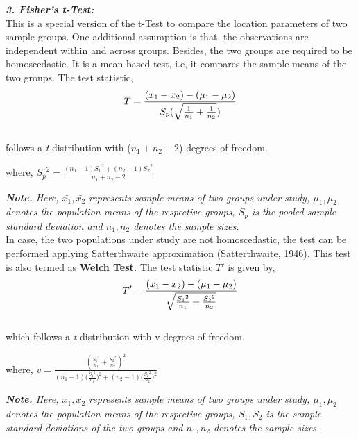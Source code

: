 \documentclass[12pt,a4paper]{report}
\begin{document}
\Large{{\textbf{\textit{3. Fisher's t-Test: }}} }\\
\Large{This is a special version of the t-Test to compare the location parameters of two sample groups. One additional assumption is that, the observations are independent within and across groups. Besides, the two groups are required to be homoscedastic. It is a mean-based test, i.e, it compares the sample means of the two groups. The test statistic,}\\
\begin{equation}
T = \frac{(\bar{x_1}-\bar{x_2}) - (\mu_1 -\mu_2)}{S_p(\sqrt{\frac{1}{n_1} + \frac{1}{n_2}})}\\
\end{equation}\\[10pt]
\Large{follows a \textit{t}-distribution with ($n_1 + n_2 - 2$) degrees of freedom.}\\
\begin{center}
where, ${S_p}^2 = \frac{(n_1 - 1){S_1}^2 + (n_2 - 1){S_2}^2}{n_1 + n_2 - 2}$\\[25pt]
\end{center}
\large{\textit{{\textbf{Note.}} Here, $\bar{x_1},\bar{x_2}$ represents sample means of two groups under study, $\mu_1,\mu_2$ denotes the population means of the respective groups, $S_p$ is the pooled sample standard deviation and $n_1,n_2$ denotes the sample sizes.}}\\[6pt]
\Large{In case, the two populations under study are not homoscedastic, the test can be performed applying Satterthwaite approximation (Satterthwaite, 1946). This test is also termed as \textbf{\large{Welch Test.}} The test statistic $T'$ is given by,}\\[6pt]
\begin{equation}
T' = \frac{(\bar{x_1}-\bar{x_2}) - (\mu_1 -\mu_2)}{\sqrt{\frac{{S_1}^2}{n_1} + \frac{{S_2}^2}{n_2}}}\\
\end{equation}\\[10pt]
\Large{which follows a \textit{t}-distribution with v degrees of freedom.}\\[0.5pt]
\begin{center}
where, $v = \frac{(\frac{{S_1}^2}{n_1}+\frac{{S_2}^2}{n_2})^2}{{(n_1 - 1){(\frac{{S_1}^2}{n_1}})^2} + {(n_2 - 1){(\frac{{S_2}^2}{n_2}})^2}}$\\[20pt]
\end{center}
\large{\textit{{\textbf{Note.}} Here, $\bar{x_1},\bar{x_2}$ represents sample means of two groups under study, $\mu_1,\mu_2$ denotes the population means of the respective groups, $S_1,S_2$ is the sample standard deviations of the two groups and $n_1,n_2$ denotes the sample sizes.}}\\[30pt]
\end{document}
